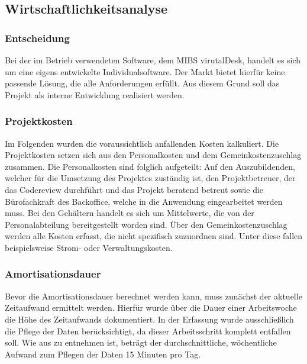 \subsection{Wirtschaftlichkeitsanalyse}
\label{sec:Wirtschaftlichkeitsanalyse}

\subsubsection{ Entscheidung}
\label{sec:Make-or-Buy Entscheidung}
Bei der im Betrieb verwendeten Software, dem MIBS virutalDesk, handelt es sich um eine eigens entwickelte Individualsoftware. Der Markt bietet hierfür keine passende Lösung, die alle Anforderungen erfüllt. Aus diesem Grund soll das Projekt als interne Entwicklung realisiert werden.

\subsubsection{Projektkosten}
\label{sec:Projektkosten}

Im Folgenden wurden die voraussichtlich anfallenden Kosten kalkuliert. Die Projektkosten setzen sich aus den Personalkosten und dem Gemeinkostenzuschlag zusammen. 
Die Personalkosten sind folglich aufgeteilt: Auf den Auszubildenden, welcher für die Umsetzung des Projektes zuständig ist, den Projektbetreuer, der das Codereview durchführt und das Projekt beratend betreut sowie die Bürofachkraft des Backoffice, welche in die Anwendung eingearbeitet werden muss.
Bei den Gehältern handelt es sich um Mittelwerte, die von der Personalabteilung bereitgestellt worden sind. Über den Gemeinkostenzuschlag werden alle Kosten erfasst, die nicht spezifisch zuzuordnen sind. Unter diese fallen beispielsweise Strom- oder Verwaltungskosten.

\newpage

\subsubsection{Amortisationsdauer}
\label{sec:Amortisationsdauer}

Bevor die Amortisationsdauer berechnet werden kann, muss zunächst der aktuelle Zeitaufwand ermittelt werden. Hierfür wurde über die Dauer einer Arbeitswoche die Höhe des Zeitaufwands dokumentiert. In der Erfassung wurde ausschließlich die Pflege der Daten berücksichtigt, da dieser Arbeitsschritt komplett entfallen soll. Wie aus  zu entnehmen ist, beträgt der durchschnittliche, wöchentliche Aufwand zum Pflegen der Daten 15 Minuten pro Tag.

